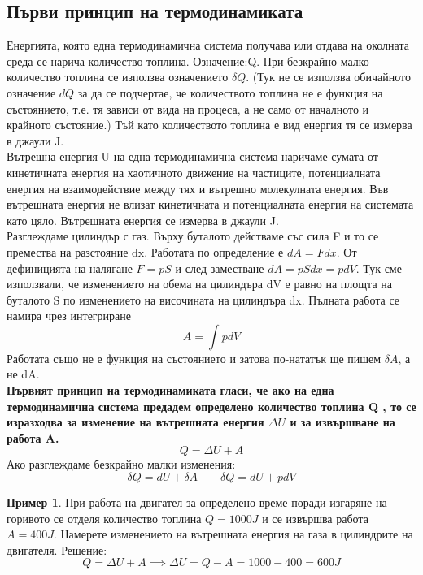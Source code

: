 \documentclass[fleqn, 12pt]{article}
\theoremstyle{definition}
\newtheorem{example}{Пример}[subsection]
\begin{document}
\subsection{Първи принцип на термодинамиката}
Енергията, която една термодинамична система получава или отдава на
околната среда се нарича количество топлина. Означение:Q. При безкрайно малко
количество топлина се използва означението $\delta Q$. 
(Тук не се използва обичайното означение $dQ$ за да се подчертае, че количеството топлина не е функция на
състоянието, т.е. тя зависи от вида на процеса, а не само от началното и крайното състояние.) 
Тъй като количеството топлина е вид енергия тя се измерва в джаули J. \\
Вътрешна енергия U на една термодинамична система наричаме сумата от
кинетичната енергия на хаотичното движение на частиците, потенциалната енергия
на взаимодействие между тях и вътрешно молекулната енергия. Във вътрешната
енергия не влизат кинетичната и потенциалната енергия на системата като цяло.
Вътрешната енергия се измерва в джаули J. \\
Разглеждаме цилиндър с газ. 
Върху буталото действаме със сила F и то се премества на разстояние dx.
Работата по определение е $dA = Fdx$. От дефиницията на налягане $F = pS$ и след заместване 
$dA = pSdx = pdV$.
Тук сме използвали, че изменението на обема на цилиндъра dV е равно на площта на буталото
S по изменението на височината на цилиндъра dx. Пълната работа се намира чрез
интегриране
$$A = \int pdV$$
Работата също не е функция на състоянието и затова по-нататък ще пишем $\delta A$, а не dA.\\
\textbf{Първият принцип на термодинамиката гласи, че ако на една
термодинамична система предадем определено количество топлина Q , то се изразходва за изменение на вътрешната енергия $\Delta U$ и за извършване на работа A.}
$$Q = \Delta U + A$$
Ако разглеждаме безкрайно малки изменения:
$$\delta Q = dU + \delta A \qquad \delta Q = dU + pdV$$
\begin{example}
При работа на двигател за определено време поради изгаряне на горивото
се отделя количество топлина $Q = 1000 J$ и се извършва работа $A = 400 J$. Намерете
изменението на вътрешната енергия на газа в цилиндрите на двигателя.
Решение: \\
$$Q = \Delta U + A \implies \Delta U = Q - A = 1000 - 400 = 600J$$
\end{example}
\end{document}
